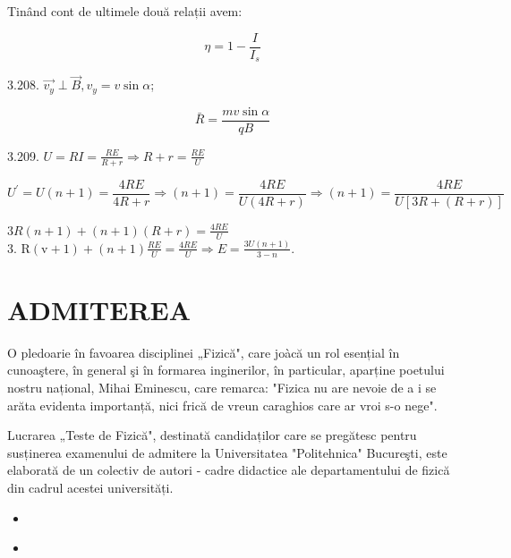 \documentclass[10pt]{article}
\begin{document}
Tinând cont de ultimele două relații avem:

$$
\eta=1-\frac{I}{I_{s}}
$$

3.208. $\overrightarrow{v_{y}} \perp \vec{B}, v_{y}=v \sin \alpha$;

$$
\bar{R}=\frac{m v \sin \alpha}{q B}
$$

3.209. $U=R I=\frac{R E}{R+r} \Rightarrow R+r=\frac{R E}{U}$

$$
U^{\prime}=U(n+1)=\frac{4 R E}{4 R+r} \Rightarrow(n+1)=\frac{4 R E}{U(4 R+r)} \Rightarrow(n+1)=\frac{4 R E}{U[3 R+(R+r)]}
$$

$3 R(n+1)+(n+1)(R+r)=\frac{4 R E}{U}$\\
3. $\mathrm{R}(\mathrm{v}+1)+(n+1) \frac{R E}{U}=\frac{4 R E}{U} \Rightarrow E=\frac{3 U(n+1)}{3-n}$.

\section*{ADMITEREA}
O pledoarie în favoarea disciplinei „Fizică", care joàcă un rol esențial în cunoaştere, în general şi în formarea inginerilor, în particular, aparține poetului nostru național, Mihai Eminescu, care remarca: "Fizica nu are nevoie de a i se arăta evidenta importanță, nici frică de vreun caraghios care ar vroi s-o nege".

Lucrarea „Teste de Fizică", destinată candidaților care se pregătesc pentru susținerea examenului de admitere la Universitatea "Politehnica" Bucureşti, este elaborată de un colectiv de autori - cadre didactice ale departamentului de fizică din cadrul acestei universități.

\begin{itemize}
  \item 
\end{itemize}

\begin{itemize}
  \item 
\end{itemize}
\end{document}
